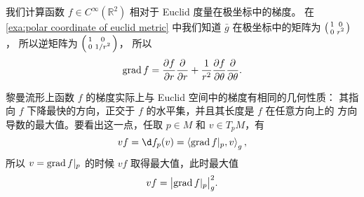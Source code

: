 \begin{example}
  我们计算函数 $f\in C^\infty(\mathbb{R}^2)$ 相对于 Euclid 度量在极坐标中的梯度。
  在 \autoref{exa:polar coordinate of euclid metric} 中我们知道 $\bar g$
  在极坐标中的矩阵为 $\begin{psmallmatrix}1 & 0 \\ 0 & r^2\end{psmallmatrix}$，
  所以逆矩阵为 $\begin{psmallmatrix}1 & 0 \\ 0 & 1/r^2\end{psmallmatrix}$，
  所以 
  \[
    \operatorname{grad} f=\frac{\partial f}{\partial r}\frac{\partial}{\partial r}+
    \frac{1}{r^2}\frac{\partial f}{\partial\theta}  \frac{\partial}{\partial \theta}.
  \]
\end{example}

黎曼流形上函数 $f$ 的梯度实际上与 Euclid 空间中的梯度有相同的几何性质：
其指向 $f$ 下降最快的方向，正交于 $f$ 的水平集，并且其长度是 $f$ 在任意方向上的
方向导数的最大值。要看出这一点，任取 $p\in M$ 和 $v\in T_pM$，有
\[
  vf=\d f_p(v)=  \inn{\grad f|_p,v}_g,
\]
所以 $v=\operatorname{grad} f|_p$ 的时候 $vf$ 取得最大值，此时最大值
\[
  vf=\bigl|\operatorname{grad} f|_p\bigr|_g^2.
\]


